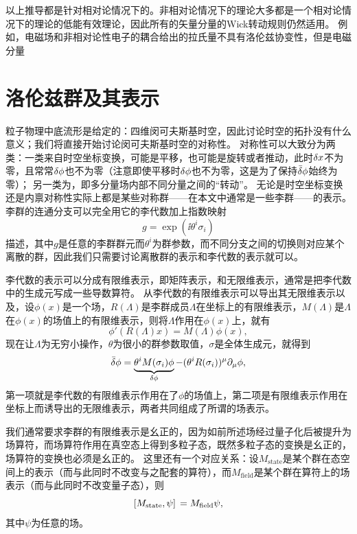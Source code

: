 以上推导都是针对相对论情况下的。非相对论情况下的理论大多都是一个相对论情况下的理论的低能有效理论，因此所有的矢量分量的Wick转动规则仍然适用。
例如，电磁场和非相对论性电子的耦合给出的拉氏量不具有洛伦兹协变性，但是电磁分量

\section{洛伦兹群及其表示}\label{sec:symmetry}

粒子物理中底流形是给定的：四维闵可夫斯基时空，因此讨论时空的拓扑没有什么意义；我们将直接开始讨论闵可夫斯基时空的对称性。
对称性可以大致分为两类：一类来自时空坐标变换，可能是平移，也可能是旋转或者推动，此时$\var{x}$不为零，且常常$\var{\phi}$也不为零（注意即使平移时$\var{\phi}$也不为零，这是为了保持$\bar{\var}{\phi}$始终为零）；
另一类为，即多分量场内部不同分量之间的“转动”。
无论是时空坐标变换还是内禀对称性实际上都是某些对称群——在本文中通常是一些李群——的表示。
李群的连通分支可以完全用它的李代数加上指数映射
\[
    g = \exp(\ii \theta^i \sigma_i)
\]
描述，其中$g$是任意的李群群元而$\theta^i$为群参数，而不同分支之间的切换则对应某个离散的群，因此我们只需要讨论离散群的表示和李代数的表示就可以。

李代数的表示可以分成有限维表示，即矩阵表示，和无限维表示，通常是把李代数中的生成元写成一些导数算符。
从李代数的有限维表示可以导出其无限维表示以及，设$\phi(x)$是一个场，$R(\Lambda)$是李群成员$\Lambda$在坐标上的有限维表示，$M(\Lambda)$是$\Lambda$在$\phi(x)$的场值上的有限维表示，则将$\Lambda$作用在$\phi(x)$上，就有
\[
    \phi'(R(\Lambda) x) = M(\Lambda) \phi(x),
\]
现在让$\Lambda$为无穷小操作，$\theta$为很小的群参数取值，$\sigma$是全体生成元，就得到
\begin{equation}
    \bar{\var}{\phi} = \underbrace{\theta^i M(\sigma_i) \phi}_{{\var{\phi}}} - (\theta^i R(\sigma_i))^\mu \partial_\mu \phi,
\end{equation}
第一项就是李代数的有限维表示作用在了$\phi$的场值上，第二项是有限维表示作用在坐标上而诱导出的无限维表示，两者共同组成了所谓的场表示。

我们通常要求李群的有限维表示是幺正的，因为如前所述场经过量子化后被提升为场算符，而场算符作用在真空态上得到多粒子态，既然多粒子态的变换是幺正的，场算符的变换也必须是幺正的。
这里还有一个对应关系：设$M_\text{state}$是某个群在态空间上的表示（而与此同时不改变与之配套的算符），而$M_\text{field}$是某个群在算符上的场表示（而与此同时不改变量子态），则
\begin{equation}
    \comm*{M_\text{state}}{\psi} = M_\text{field} \psi,
    \label{eq:field-and-state-corr}
\end{equation}
其中$\psi$为任意的场。

